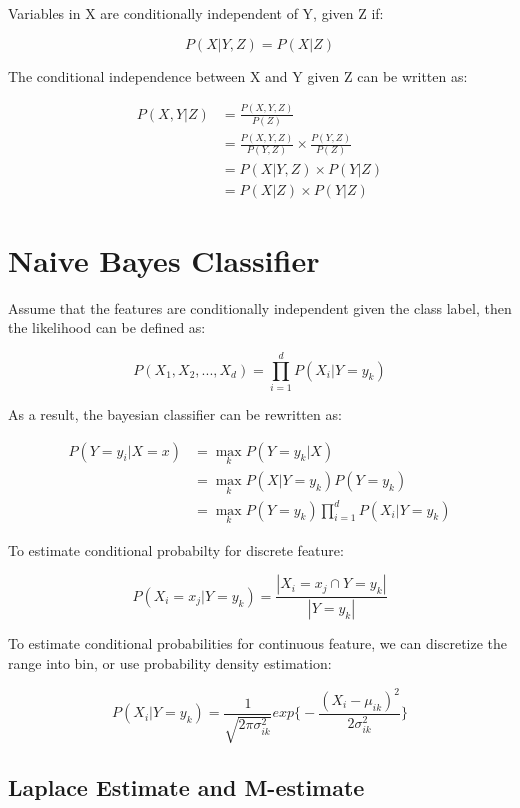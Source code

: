 \begin{multicols}{2}
\noindent Variables in X are conditionally independent of Y, given Z if:

$$P(X|Y,Z) = P(X|Z)$$ 

\noindent The conditional independence between X and Y given Z can be written as:

\begin{equation*}
\begin{split}
    P(X,Y|Z) &= \frac{P(X,Y,Z)}{P(Z)}\\
    &= \frac{P(X,Y,Z)}{P(Y,Z)}\times \frac{P(Y,Z)}{P(Z)} \\
    &= P(X|Y,Z) \times P(Y|Z) \\
    &= P(X|Z) \times P(Y|Z)
\end{split}
\end{equation*}

\section{Naive Bayes Classifier}

\noindent Assume that the features are conditionally independent given the class label, then the likelihood can be defined as:

$$P(X_1, X_2, ..., X_d) = \prod_{i=1}^{d} P(X_{i}|Y = y_{k})$$

\noindent As a result, the bayesian classifier can be rewritten as:

\begin{equation*}
\begin{split}
    P(Y=y_{i}|X=x) &= \!\max_{k} P(Y=y_{k}|X) \\
    &= \!\max_{k} P(X | Y = y_k) P(Y= y_k) \\
    &= \!\max_{k} P(Y=y_k) \prod_{i=1}^{d} P(X_{i}|Y = y_{k})
\end{split}
\end{equation*}

\noindent To estimate conditional probabilty for discrete feature:

$$P(X_i=x_j|Y=y_k) = \frac{|X_i = x_j \cap Y=y_k|}{|Y=y_k|}$$

\noindent To estimate conditional probabilities for continuous feature, we can discretize the range into bin, or use probability density estimation:

$$P(X_{i}| Y=y_{k}) = \frac{1}{\sqrt{2 \pi \sigma^{2}_{ik}}} exp \bigg\{ - \frac{(X_{i} - \mu_{ik})^{2} }{2 \sigma^{2}_{ik}} \bigg\}$$

\subsection{Laplace Estimate and M-estimate}


\end{multicols}
